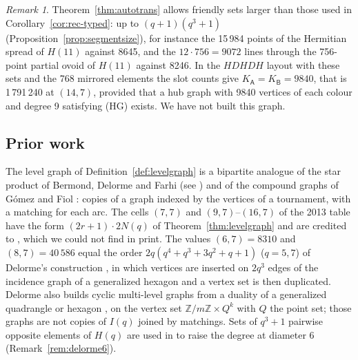 \documentclass[11pt]{amsart}
\theoremstyle{definition}
\theoremstyle{remark}
\newtheorem{remark}[theorem]{Remark}
\numberwithin{equation}{section}
\newcommand{\Z}{\mathbb Z}
\begin{document}
\begin{remark}
Theorem~\ref{thm:autotrans} allows friendly sets larger than those used in Corollary~\ref{cor:rec-typed}: up to
$(q+1)(q^3+1)$ (Proposition~\ref{prop:segmentsize}), for instance the 15\,984 points of the Hermitian spread of $H(11)$
against 8645, and the $12\cdot756=9072$ lines through the 756-point partial ovoid of $H(11)$ against 8246. In the
$HDHDH$ layout with these sets and the 768 mirrored elements the slot counts give $K_{\mathsf A}=K_{\mathsf B}=9840$, that
is 1\,791\,240 at $(14,7)$, provided that a hub graph with 9840 vertices of each colour and degree 9 satisfying (HG) exists.
We have not built this graph.
\end{remark}

\subsection{Prior work}\label{ssec:d7prior}
The level graph of Definition~\ref{def:levelgraph} is a bipartite analogue of the star product of Bermond, Delorme and
Farhi \cite{BDF82,BDF84} (see \cite[\S3.3.2]{MS13}) and of the compound graphs of G\'omez and Fiol \cite{GF85}: copies of a
graph indexed by the vertices of a tournament, with a matching for each arc. The cells $(7,7)$ and $(9,7)$--$(16,7)$ of the
2013 table have the form $(2r+1)\cdot2N(q)$ of Theorem~\ref{thm:levelgraph} and are credited to \cite{DGQ}, which we could
not find in print. The values $(6,7)=8310$ and $(8,7)=40\,586$ equal the order $2q(q^4+q^3+3q^2+q+1)$ ($q=5,7$) of Delorme's
construction \cite[\S9]{D85a}, in which vertices are inserted on $2q^3$ edges of the incidence graph of a generalized
hexagon and a vertex set is then duplicated. Delorme also builds cyclic multi-level graphs from a duality of a generalized
quadrangle or hexagon \cite[\S3]{D85a}, on the vertex set $\Z/m\Z\times Q^k$ with $Q$ the point set; those graphs are not
copies of $I(q)$ joined by matchings. Sets of $q^3+1$ pairwise opposite elements of $H(q)$ are used in \cite[\S8(b)]{D85a}
to raise the degree at diameter 6 (Remark~\ref{rem:delorme6}).
\end{document}
